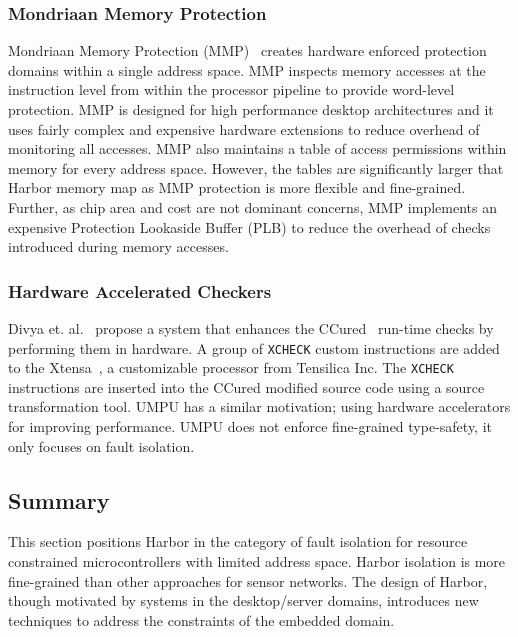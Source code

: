 \subsubsection{Mondriaan Memory Protection}
%
Mondriaan Memory Protection (MMP)~\cite{witchel-asplos02-mondrian}
creates hardware enforced protection domains within a single address
space.
%
MMP inspects memory accesses at the instruction level from within the
processor pipeline to provide word-level protection.
%
MMP is designed for high performance desktop architectures and it uses
fairly complex and expensive hardware extensions to reduce overhead of
monitoring all accesses.
%
MMP also maintains a table of access permissions within memory for
every address space.
%
However, the tables are significantly larger that Harbor memory map as
MMP protection is more flexible and fine-grained.
%
Further, as chip area and cost are not dominant concerns, MMP
implements an expensive Protection Lookaside Buffer (PLB) to reduce
the overhead of checks introduced during memory accesses.
%
\subsubsection{Hardware Accelerated Checkers}
%
Divya et. al.~\cite{divya06ccured} propose a system that enhances the
CCured~\cite{ccured02necula} run-time checks by performing them in
hardware.
%
A group of \texttt{XCHECK} custom instructions are added to the
Xtensa~\cite{xtensads}, a customizable processor from Tensilica Inc.
%
The \texttt{XCHECK} instructions are inserted into the CCured modified
source code using a source transformation tool.
%
UMPU has a similar motivation; using hardware accelerators for
improving performance.
%
UMPU does not enforce fine-grained type-safety, it only focuses on
fault isolation.
%
\subsection{Summary}
%
This section positions Harbor in the category of fault isolation for
resource constrained microcontrollers with limited address space.
%
Harbor isolation is more fine-grained than other approaches for sensor
networks.
%
The design of Harbor, though motivated by systems in the
desktop/server domains, introduces new techniques to address the
constraints of the embedded domain.


